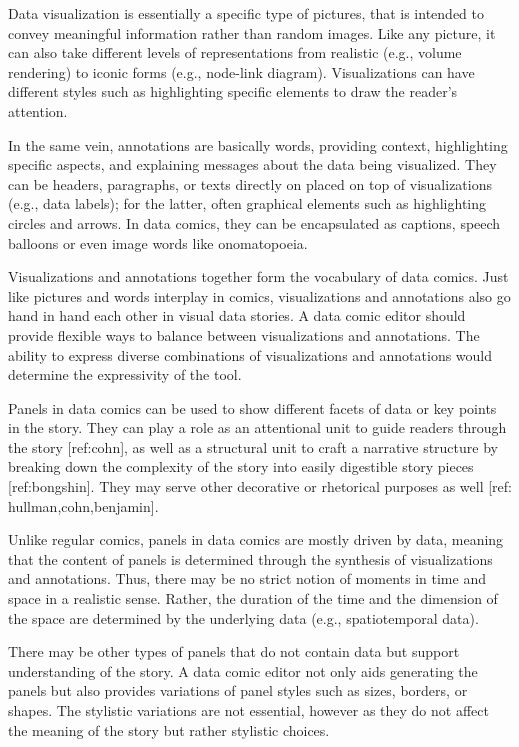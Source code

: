 Data visualization is essentially a specific type of pictures, that is intended to convey meaningful information rather than random images. Like any picture, it can also take different levels of representations from realistic (e.g., volume rendering) to iconic forms (e.g., node-link diagram). Visualizations can have different styles such as highlighting specific elements to draw the reader's attention. 

In the same vein, annotations are basically words, providing context, highlighting specific aspects, and explaining messages about the data being visualized. They can be headers, paragraphs, or texts directly on placed on top of visualizations (e.g., data labels); for the latter, often graphical elements such as highlighting circles and arrows. In data comics, they can be encapsulated as captions, speech balloons or even image words like onomatopoeia. 

Visualizations and annotations together form the vocabulary of data comics. Just like pictures and words interplay in comics, visualizations and annotations also go hand in hand each other in visual data stories. A data comic editor should provide flexible ways to balance between visualizations and annotations. The ability to express diverse combinations of visualizations and annotations would determine the expressivity of the tool.


Panels in data comics can be used to show different facets of data or key points in the story. They can play a role as an attentional unit to guide readers through the story [ref:cohn], as well as a structural unit to craft a narrative structure by breaking down the complexity of the story into easily digestible story pieces [ref:bongshin]. They may serve other decorative or rhetorical purposes as well [ref: hullman,cohn,benjamin]. 

Unlike regular comics, panels in data comics are mostly driven by data, meaning that the content of panels is determined through the synthesis of visualizations and annotations. Thus, there may be no strict notion of moments in time and space in a realistic sense. Rather, the duration of the time and the dimension of the space are determined by the underlying data (e.g., spatiotemporal data). 

There may be other types of panels that do not contain data but support understanding of the story. A data comic editor not only aids generating the panels but also provides variations of panel styles such as sizes, borders, or shapes. The stylistic variations are not essential, however as they do not affect the meaning of the story but rather stylistic choices.

